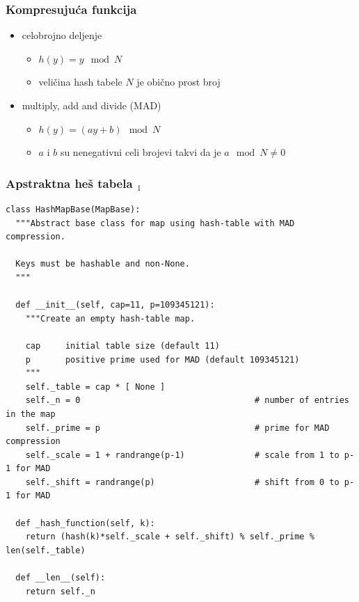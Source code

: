 \documentclass[compress]{beamer}
\begin{document}
\begin{frame}[fragile]
  \frametitle{Kompresujuća funkcija}
  \begin{itemize}
    \item celobrojno deljenje
    \begin{itemize}
      \item $h(y) = y \mod N$
      \item veličina hash tabele $N$ je obično prost broj
    \end{itemize}
    \item multiply, add and divide (MAD)
    \begin{itemize}
      \item $h(y) = (ay+b) \mod N$
      \item $a$ i $b$ su nenegativni celi brojevi takvi da je $a\mod N \neq 0$
    \end{itemize}
  \end{itemize}
\end{frame}

\begin{frame}
  \frametitle{Apstraktna heš tabela $_1$}
\begin{verbatim}
class HashMapBase(MapBase):
  """Abstract base class for map using hash-table with MAD compression.

  Keys must be hashable and non-None.
  """

  def __init__(self, cap=11, p=109345121):
    """Create an empty hash-table map.

    cap     initial table size (default 11)
    p       positive prime used for MAD (default 109345121)
    """
    self._table = cap * [ None ]
    self._n = 0                                   # number of entries in the map
    self._prime = p                               # prime for MAD compression
    self._scale = 1 + randrange(p-1)              # scale from 1 to p-1 for MAD
    self._shift = randrange(p)                    # shift from 0 to p-1 for MAD

  def _hash_function(self, k):
    return (hash(k)*self._scale + self._shift) % self._prime % len(self._table)

  def __len__(self):
    return self._n
\end{verbatim}
\end{frame}
\end{document}
